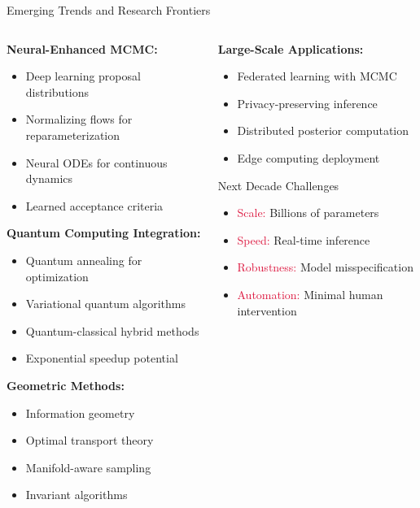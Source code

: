 \documentclass[aspectratio=169,11pt]{beamer}
\begin{document}
\begin{frame}{Emerging Trends and Research Frontiers}
\begin{columns}
\begin{column}{0.5\textwidth}
\textbf{Neural-Enhanced MCMC:}
\begin{itemize}
\item Deep learning proposal distributions
\item Normalizing flows for reparameterization
\item Neural ODEs for continuous dynamics
\item Learned acceptance criteria
\end{itemize}

\vspace{0.3cm}
\textbf{Quantum Computing Integration:}
\begin{itemize}
\item Quantum annealing for optimization
\item Variational quantum algorithms
\item Quantum-classical hybrid methods
\item Exponential speedup potential
\end{itemize}

\vspace{0.3cm}
\textbf{Geometric Methods:}
\begin{itemize}
\item Information geometry
\item Optimal transport theory
\item Manifold-aware sampling
\item Invariant algorithms
\end{itemize}
\end{column}
\begin{column}{0.5\textwidth}
\textbf{Large-Scale Applications:}
\begin{itemize}
\item Federated learning with MCMC
\item Privacy-preserving inference
\item Distributed posterior computation
\item Edge computing deployment
\end{itemize}

\vspace{0.3cm}
\begin{block}{Next Decade Challenges}
\begin{itemize}
\item \textcolor{crimson}{Scale:} Billions of parameters
\item \textcolor{crimson}{Speed:} Real-time inference
\item \textcolor{crimson}{Robustness:} Model misspecification
\item \textcolor{crimson}{Automation:} Minimal human intervention
\end{itemize}
\end{block}


\end{column}
\end{columns}
\end{frame}
\end{document}
